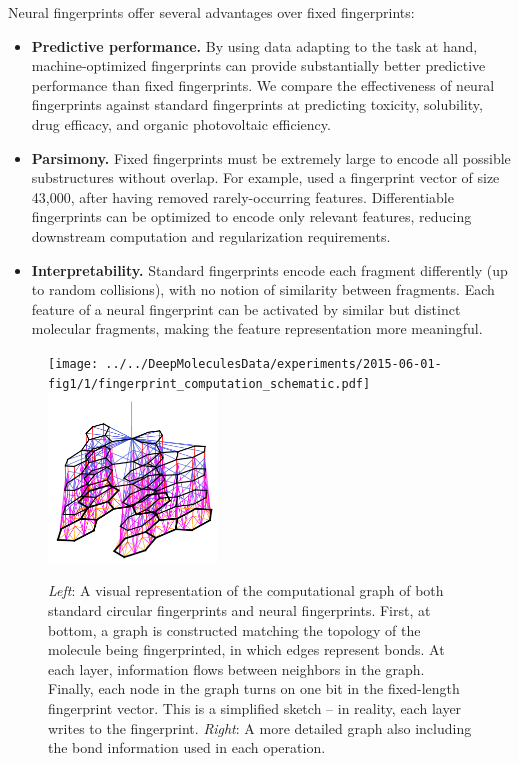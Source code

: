 \documentclass{article}
\begin{document}
Neural fingerprints offer several advantages over fixed fingerprints:
\begin{itemize}
\item {\bf Predictive performance.}
By using data adapting to the task at hand, machine-optimized fingerprints can provide substantially better predictive performance than fixed fingerprints.
We compare the effectiveness of neural fingerprints against standard fingerprints at predicting toxicity, solubility, drug efficacy, and organic photovoltaic efficiency.
\item {\bf Parsimony.}
Fixed fingerprints must be extremely large to encode all possible substructures without overlap.
For example, \cite{unterthinerdeep} used a fingerprint vector of size 43,000, after having removed rarely-occurring features.
Differentiable fingerprints can be optimized to encode only relevant features, reducing downstream computation and regularization requirements.
\item {\bf Interpretability.}
Standard fingerprints encode each fragment differently (up to random collisions), with no notion of similarity between fragments.
Each feature of a neural fingerprint can be activated by similar but distinct molecular fragments, making the feature representation more meaningful.
\end{itemize}

\begin{figure}
\centerline{\texttt{[image: ../../DeepMoleculesData/experiments/2015-06-01-fig1/1/fingerprint\_computation\_schematic.pdf]}
\hspace{2em}
\includegraphics[width=0.4\textwidth, clip, trim=4mm 4mm 4mm 8mm]{figures/3d-nets/net1}}
\caption{\emph{Left}: A visual representation of the computational graph of both standard circular fingerprints and neural fingerprints.
First, at bottom, a graph is constructed matching the topology of the molecule being fingerprinted, in which edges represent bonds.
At each layer, information flows between neighbors in the graph.
Finally, each node in the graph turns on one bit in the fixed-length fingerprint vector.
This is a simplified sketch -- in reality, each layer writes to the fingerprint.
\emph{Right}: A more detailed graph also including the bond information used in each operation.}
\label{fig:architecture sketch}
\end{figure}
\end{document}
